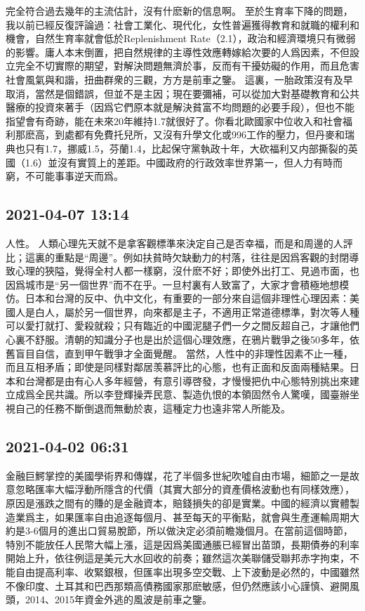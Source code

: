 \documentclass[twocolumn]{ctexart}
\begin{document}
完全符合過去幾年的主流估計，沒有什麽新的信息啊。
至於生育率下降的問題，我以前已經反復評論過：社會工業化、現代化，女性普遍獲得教育和就職的權利和機會，自然生育率就會低於Replenishment Rate（2.1），政治和經濟環境只有微弱的影響。庸人本末倒置，把自然規律的主導性效應轉嫁給次要的人爲因素，不但設立完全不切實際的期望，對解決問題無濟於事，反而有干擾妨礙的作用，而且危害社會風氣與和諧，扭曲群衆的三觀，方方是前車之鑒。
這裏，一胎政策沒有及早取消，當然是個錯誤，但並不是主因；現在要彌補，可以從加大對基礎教育和公共醫療的投資來著手（因爲它們原本就是解決貧富不均問題的必要手段），但也不能指望會有奇跡，能在未來20年維持1.7就很好了。你看北歐國家中位收入和社會福利那麽高，到處都有免費托兒所，又沒有升學文化或996工作的壓力，但丹麥和瑞典也只有1.7，挪威1.5，芬蘭1.4，比起保守黨執政十年，大砍福利又内部撕裂的英國（1.6）並沒有實質上的差距。中國政府的行政效率世界第一，但人力有時而窮，不可能事事逆天而爲。
\subsection*{2021-04-07 13:14}

人性。
人類心理先天就不是拿客觀標準來決定自己是否幸福，而是和周邊的人評比；這裏的重點是“周邊”。例如扶貧時欠缺動力的村落，往往是因爲客觀的封閉導致心理的狹隘，覺得全村人都一樣窮，沒什麽不好；即使外出打工、見過市面，也因爲城市是“另一個世界”而不在乎。一旦村裏有人致富了，大家才會積極地想模仿。日本和台灣的反中、仇中文化，有重要的一部分來自這個非理性心理因素：美國人是白人，屬於另一個世界，向來都是主子，不適用正常道德標準，對次等人種可以愛打就打、愛殺就殺；只有臨近的中國泥腿子們一夕之間反超自己，才讓他們心裏不舒服。清朝的知識分子也是出於這個心理效應，在鴉片戰爭之後50多年，依舊盲目自信，直到甲午戰爭才全面覺醒。
當然，人性中的非理性因素不止一種，而且互相矛盾；即使是同樣對鄰居羡慕評比的心態，也有正面和反面兩種結果。日本和台灣都是由有心人多年經營，有意引導啓發，才慢慢把仇中心態特別挑出來建立成爲全民共識。所以李登輝操弄民意、製造仇恨的本領固然令人驚嘆，國臺辦坐視自己的任務不斷倒退而無動於衷，這種定力也遠非常人所能及。
\subsection*{2021-04-02 06:31}

金融巨鰐掌控的美國學術界和傳媒，花了半個多世紀吹噓自由市場，細節之一是故意忽略匯率大幅浮動所隱含的代價（其實大部分的資產價格波動也有同樣效應），原因是漲跌之間有的賺的是金融資本，賠錢損失的卻是實業。中國的經濟以實體製造業爲主，如果匯率自由追逐每個月、甚至每天的平衡點，就會與生產運輸周期大約是3-6個月的進出口貿易脫節，所以做決定必須前瞻幾個月。在當前這個時節，特別不能放任人民幣大幅上漲，這是因爲美國通脹已經冒出苗頭，長期債券的利率開始上升，依往例這是美元大水回收的前奏；雖然這次美聯儲受聯邦赤字拘束，不能自由提高利率、收緊銀根，但匯率出現多空交戰、上下波動是必然的，中國雖然不像印度、土耳其和巴西那類高債務國家那麽敏感，但仍然應該小心謹慎、避開風頭，2014、2015年資金外逃的風波是前車之鑒。
\end{document}
